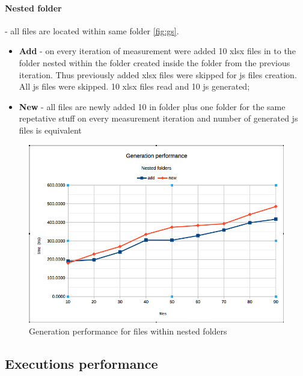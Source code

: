 \paragraph{Nested folder} - all files are located within same folder \ref{fig:gs}.
\begin{itemize}
	\item \textbf{Add} - on every iteration of measurement were added 10 xlsx files in to the folder nested within the folder created inside the folder from the previous iteration. Thus previously added xlsx files were skipped for js files creation. All js files were skipped. 10 xlsx files read and 10 js generated;
	\item \textbf{New} - all files are newly added 10 in folder plus one folder for the same repetative stuff on every measurement iteration and number of generated js files is equivalent
\end{itemize}


\begin{figure}[ht]
	\label{fig:gn}
	\centering
	\includegraphics[width=\textwidth]{grafiken/generation_nested}
	\caption{Generation performance for files within nested folders}
\end{figure}

\subsection{Executions performance}

